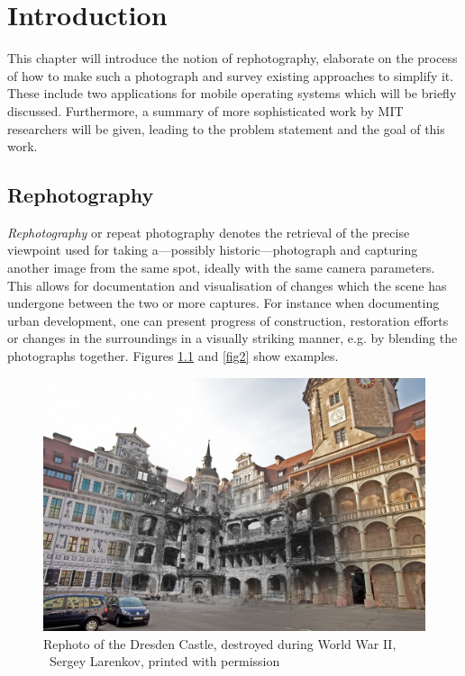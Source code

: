 \chapter{Introduction}

This chapter will introduce the notion of rephotography, elaborate on the
process of how to make such a photograph and survey existing approaches to
simplify it. These include two applications for mobile operating systems which
will be briefly discussed. Furthermore, a summary of more sophisticated work by
MIT researchers will be given, leading to the problem statement and the goal of
this work.

\section{Rephotography}

\emph{Rephotography} or repeat photography denotes the retrieval of the precise
viewpoint used for taking a---possibly historic---photograph and capturing
another image from the same spot, ideally with the same camera parameters. This
allows for documentation and visualisation of changes which the scene has
undergone between the two or more captures.  For instance when documenting urban
development, one can present progress of construction, restoration efforts or
changes in the surroundings in a visually striking manner, e.g. by blending the
photographs together.  Figures \ref{fig1} and \ref{fig2} show examples.

\begin{figure}
   \includegraphics[width=\textwidth]{gfx/1945_2014_Residenzschloss_small.jpg}
   \caption[Rephoto of Dresden Castle]{Rephoto of the Dresden Castle, destroyed during World War II,
   \textcopyright\ Sergey Larenkov, printed with permission}
   \label{fig1}
\end{figure}

